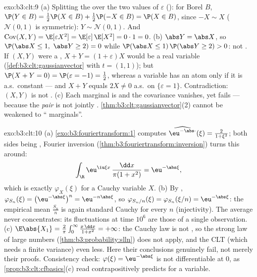 \begin{solution}{exo:b3:clt:9}
(a) Splitting the  over the two values of
$\varepsilon$ (): for Borel $B$, $\P(Y \in B) =
\frac12\P(X \in B) + \frac12\P(-X \in B) = \P(X \in B)$,
since $-X \sim X$ ($\mathcal N(0,1)$ is symmetric): $Y \sim
\mathcal N(0,1)$. And $\operatorname{Cov}(X, Y) =
\E[\varepsilon X^2] = \E[\varepsilon]\,\E[X^2] = 0 \cdot 1 =
0$.
(b) $\abs Y = \abs X$, so $\P(\abs X \leq 1,\ \abs Y \geq 2)
= 0$ while $\P(\abs X \leq 1)\,\P(\abs Y \geq 2) > 0$: not
. If $(X, Y)$ were a , $X + Y =
(1 + \varepsilon)X$ would be a real  variable
(\cref{def:b3:clt:gaussianvector} with $t = (1,1)$); but
$\P(X + Y = 0) = \P(\varepsilon = -1) = \frac12$, whereas a
 variable has an atom only if it is a.s.\ constant
--- and $X + Y$ equals $2X \neq 0$ a.s.\ on
$\{\varepsilon = 1\}$. Contradiction: $(X, Y)$ is not
.
(c) Each marginal is  and the covariance vanishes,
yet  fails --- because the \emph{pair} is not
jointly . \cref{thm:b3:clt:gaussianvector}(2) cannot
be weakened to `` marginals''.
\end{solution}

\begin{solution}{exo:b3:clt:10}
(a) \cref{exo:b3:fouriertransform:1} computes
$\widehat{\eu^{-\abs\cdot}}(\xi) = \frac{2}{1 + \xi^2}$;
both sides being , Fourier inversion
(\cref{thm:b3:fouriertransform:inversion}) turns this
around:
\[
\int_\R\eu^{\iu\xi x}\,\frac{\dd x}{\pi(1 + x^2)} =
\eu^{-\abs\xi},
\]
which is exactly $\varphi_X(\xi)$ for a Cauchy variable $X$.
(b) By , $\varphi_{S_n}(\xi) =
\bigl(\eu^{-\abs\xi}\bigr)^n = \eu^{-n\abs\xi}$, so
$\varphi_{S_n/n}(\xi) = \varphi_{S_n}(\xi/n) =
\eu^{-\abs\xi}$: the empirical mean $\frac{S_n}n$ is again
standard Cauchy for every $n$ (injectivity). The average
never concentrates: its fluctuations at time $10^6$ are
those of a single observation.
(c) $\E\abs{X_1} = \frac2\pi\int_0^\infty\frac{x\,\dd x}{1 +
x^2} = +\infty$: the Cauchy law is not , so the
strong law of large numbers
(\cref{thm:b3:probability:slln}) does not apply, and the CLT
(which needs a finite variance) even less. Here their
conclusions genuinely fail, not merely their proofs.
Consistency check: $\varphi(\xi) = \eu^{-\abs\xi}$ is not
differentiable at $0$, as \cref{prop:b3:clt:cfbasics}(c)
read contrapositively predicts for a 
variable.
\end{solution}

